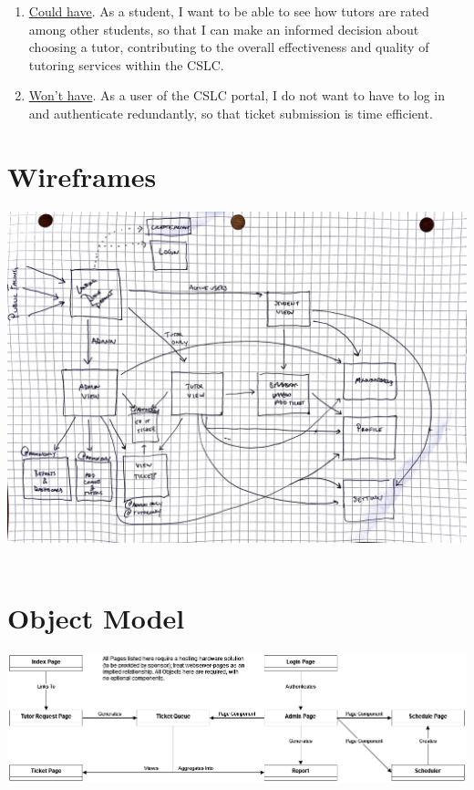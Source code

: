 \documentclass[oneside,openany,obeyspaces]{book}
\begin{document}
\begin{flushleft}
\begin{enumerate}
        \item \underline{Could have}. As a student, I want to be able to see how tutors are rated among other students, so that I can make an informed decision about choosing a tutor, contributing to the overall effectiveness and quality of tutoring services within the CSLC.
        \item \underline{Won’t have}. As a user of the CSLC portal, I do not want to have to log in and authenticate redundantly, so that ticket submission is time efficient.
    \end{enumerate}

    \section{Wireframes}

    \includegraphics[width=160mm,scale=0.5]{img/wireframe.jpg}\\~\\


    \section{Object Model}

    \includegraphics[width=160mm,scale=0.5]{img/UML Object Model.png}\\~\\


\end{flushleft}
\end{document}
